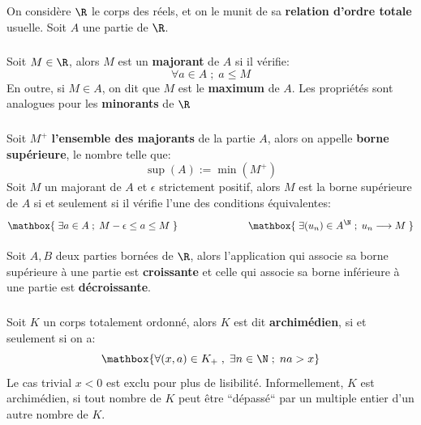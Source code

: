\chapter*{}
On considère \(\R\) le corps des réels, et on le munit de sa \textbf{relation d'ordre totale} usuelle.\+
Soit \(A\) une partie de \(\R\).

\subsection*{}
Soit \(M \in \R\), alors \(M\) est un \textbf{majorant} de \(A\) si il vérifie:
\[
    \forall a \in A \; ; \; a \leq M
\]
En outre, si \(M \in A\), on dit que \(M\) est le \textbf{maximum} de \(A\). Les propriétés sont analogues pour les \textbf{minorants} de \(\R\)

\subsection*{}
Soit \(M^+\) \textbf{l'ensemble des majorants} de la partie \(A\), alors on appelle \textbf{borne supérieure}, le nombre telle que:
\[
    \sup(A) := \min(M^+)
\]
Soit \(M\) un majorant de \(A\) et \(\epsilon\) strictement positif, alors \(M\) est la borne supérieure de \(A\) si et seulement si il vérifie l'une des conditions équivalentes:
\[
    \setlength{\fboxsep}{0.1em}
    \mathbox{
        \;\vphantom{\Bigl(\Bigl)} \exists a \in A \; ; \; M - \epsilon \leq a \leq M \;
    }
    \;\;\;\;\;\;\;\;\;\;\;\;\;\;\;\;\;\;\;\;\;\;\;\;\;
    \mathbox{
        \;\vphantom{\Bigl(\Bigl)}\exists (u_n) \in A^\N \; ; \; u_n \longrightarrow M \;
    }
\]

Soit \(A, B\) deux parties bornées de \(\R\), alors l'application qui associe sa borne supérieure à une partie est \textbf{croissante} et celle qui associe sa borne inférieure à une partie est \textbf{décroissante}.

\subsection*{}
Soit \(K\) un corps totalement ordonné, alors \(K\) est dit \textbf{archimédien}, si et seulement si on a:
\[
    \mathbox{
        \forall (x, a) \in K_+ \; , \; \exists n \in \N \; ; \; na > x
    }
\]
Le cas trivial \(x < 0\) est exclu pour plus de lisibilité.\+
Informellement, \(K\) est archimédien, si tout nombre de \(K\) peut être ``dépassé`` par un multiple entier d'un autre nombre de \(K\).\<

